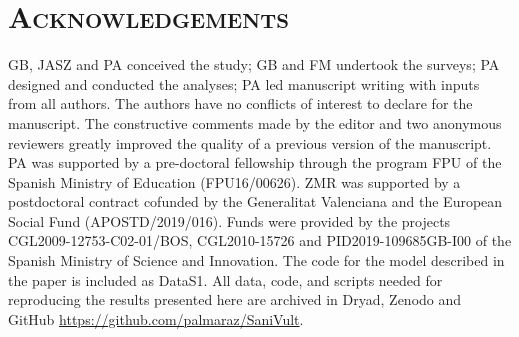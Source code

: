 \documentclass[12pt]{article}
\begin{document}
\section*{\textsc{Acknowledgements}}
GB, JASZ and PA conceived the study; GB and FM undertook the surveys; PA designed and conducted the analyses; PA led manuscript writing with inputs from all authors. The authors have no conflicts of interest to declare for the manuscript. The constructive comments made by the editor and two anonymous reviewers greatly improved the quality of a previous version of the manuscript. PA was supported by a pre-doctoral fellowship through the program FPU of the Spanish Ministry of Education (FPU16/00626). ZMR was supported by a postdoctoral contract cofunded by the Generalitat Valenciana and the European Social Fund (APOSTD/2019/016). Funds were provided by the projects CGL2009-12753-C02-01/BOS, CGL2010-15726 and PID2019-109685GB-I00 of the Spanish Ministry of Science and Innovation. The code for the model described in the paper is included as DataS1. All data, code, and scripts needed for reproducing the results presented here are archived in Dryad, Zenodo  and GitHub \url{https://github.com/palmaraz/SaniVult}.

%
\end{document}
